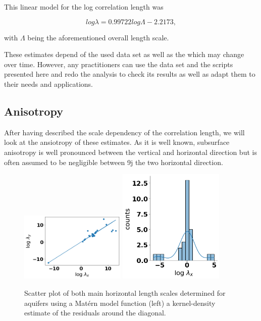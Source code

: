 \documentclass{article}
\begin{document}
This linear model for the log correlation length was

$$
    log \lambda = 0.99722 log \Lambda - 2.2173,
$$ 

with $\Lambda$ being the aforementioned overall length scale.

These estimates depend of the used data set as well as the which may change over time. However, any practitioners can use the data set and the scripts presented here and redo the analysis to check its results as well as adapt them to their needs and applications.


\subsection{Anisotropy}

After having described the scale dependency of the correlation length, we will look at the ansiotropy of these estimates. As it is well known, subsurface anisotropy is well pronounced between the vertical and horizontal direction but is often assumed to be negligible between     9j  the two horizontal direction.

\begin{figure}[ht]
    \includegraphics[width=0.45\textwidth]{fig/anisotropy_y_scatter.png}
    \includegraphics[width=0.45\textwidth]{fig/anisotropy_y_kde.png}
    \caption{Scatter plot of both main horizontal length scales determined for aquifers using a Mat{\'e}rn model function (left) a kernel-density estimate of the residuals around the diagonal.}
    \label{fig:anisotropy_y}
\end{figure}
\end{document}
